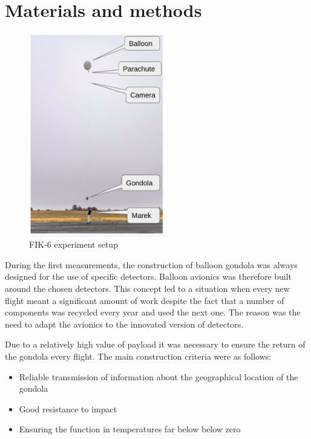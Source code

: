 \documentclass{Rpd}
\begin{document}
\section{Materials and methods}


\begin{center}
\begin{figure}%
	\centerline{\includegraphics[width=60mm]{img/FIK-6_experiment_setup.png}}
	\caption{FIK-6 experiment setup \label{FIK-6_setup}}
\end{figure}
\end{center}

During the first measurements, the construction of balloon gondola was always designed for the use of specific detectors. Balloon avionics was therefore built around the chosen detectors.
This concept led to a situation when every new flight meant a significant amount of work despite the fact that a number of components was recycled every year and used the next one. The reason was the need to adapt the avionics to the innovated version of detectors.

Due to a relatively high value of payload it was necessary to ensure the return of the gondola every flight. The main construction criteria were as follows:


\begin{itemize}
\item Reliable transmission of information about the geographical location of the gondola
\item Good resistance to impact
\item Ensuring the function in temperatures far below below zero
\end{itemize}
\end{document}
